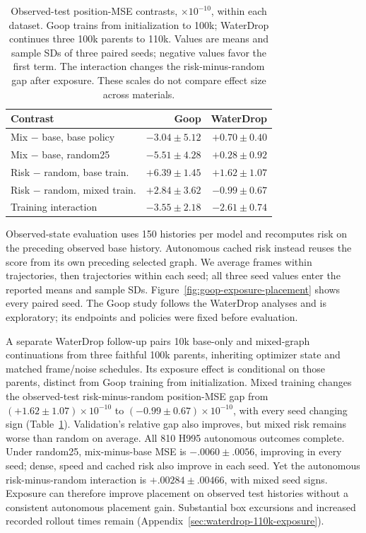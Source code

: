 \begin{table}[t]
\centering\small
\caption{Observed-test position-MSE contrasts, $\times10^{-10}$, within each dataset. Goop trains from initialization to 100k; WaterDrop continues three 100k parents to 110k. Values are means and sample SDs of three paired seeds; negative values favor the first term. The interaction changes the risk-minus-random gap after exposure. These scales do not compare effect size across materials.}
\label{tab:goop-exposure-placement}
\setlength{\tabcolsep}{3pt}
\begin{tabular}{lrr}
\toprule
Contrast & Goop & WaterDrop\\
\midrule
Mix $-$ base, base policy & $-3.04\pm5.12$ & $+0.70\pm0.40$\\
Mix $-$ base, random25 & $-5.51\pm4.28$ & $+0.28\pm0.92$\\
Risk $-$ random, base train. & $+6.39\pm1.45$ & $+1.62\pm1.07$\\
Risk $-$ random, mixed train. & $+2.84\pm3.62$ & $-0.99\pm0.67$\\
Training interaction & $-3.55\pm2.18$ & $-2.61\pm0.74$\\
\bottomrule
\end{tabular}
\end{table}

Observed-state evaluation uses 150 histories per model and recomputes risk on the preceding observed base history. Autonomous cached risk instead reuses the score from its own preceding selected graph. We average frames within trajectories, then trajectories within each seed; all three seed values enter the reported means and sample SDs. Figure~\ref{fig:goop-exposure-placement} shows every paired seed. The Goop study follows the WaterDrop analyses and is exploratory; its endpoints and policies were fixed before evaluation.

A separate WaterDrop follow-up pairs 10k base-only and mixed-graph continuations from three faithful 100k parents, inheriting optimizer state and matched frame/noise schedules. Its exposure effect is conditional on those parents, distinct from Goop training from initialization. Mixed training changes the observed-test risk-minus-random position-MSE gap from $(+1.62\pm1.07)\times10^{-10}$ to $(-0.99\pm0.67)\times10^{-10}$, with every seed changing sign (Table~\ref{tab:goop-exposure-placement}). Validation's relative gap also improves, but mixed risk remains worse than random on average. All 810 H995 autonomous outcomes complete. Under random25, mix-minus-base MSE is $-.0060\pm.0056$, improving in every seed; dense, speed and cached risk also improve in each seed. Yet the autonomous risk-minus-random interaction is $+.00284\pm.00466$, with mixed seed signs. Exposure can therefore improve placement on observed test histories without a consistent autonomous placement gain. Substantial box excursions and increased recorded rollout times remain (Appendix~\ref{sec:waterdrop-110k-exposure}).

